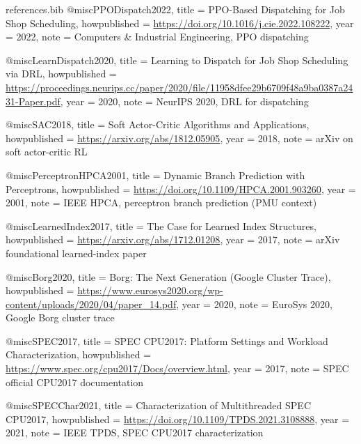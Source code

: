 \begin{filecontents*}{references.bib}
@misc{PPODispatch2022,
  title = {{PPO}-Based Dispatching for Job Shop Scheduling},
  howpublished = {\url{https://doi.org/10.1016/j.cie.2022.108222}},
  year = {2022},
  note = {Computers \& Industrial Engineering, PPO dispatching}
}

@misc{LearnDispatch2020,
  title = {Learning to Dispatch for Job Shop Scheduling via {DRL}},
  howpublished = {\url{https://proceedings.neurips.cc/paper/2020/file/11958dfee29b6709f48a9ba0387a2431-Paper.pdf}},
  year = {2020},
  note = {NeurIPS 2020, DRL for dispatching}
}

@misc{SAC2018,
  title = {Soft Actor-Critic Algorithms and Applications},
  howpublished = {\url{https://arxiv.org/abs/1812.05905}},
  year = {2018},
  note = {arXiv on soft actor-critic RL}
}

@misc{PerceptronHPCA2001,
  title = {Dynamic Branch Prediction with Perceptrons},
  howpublished = {\url{https://doi.org/10.1109/HPCA.2001.903260}},
  year = {2001},
  note = {IEEE HPCA, perceptron branch prediction (PMU context)}
}

@misc{LearnedIndex2017,
  title = {The Case for Learned Index Structures},
  howpublished = {\url{https://arxiv.org/abs/1712.01208}},
  year = {2017},
  note = {arXiv foundational learned-index paper}
}

@misc{Borg2020,
  title = {Borg: The Next Generation ({Google} Cluster Trace)},
  howpublished = {\url{https://www.eurosys2020.org/wp-content/uploads/2020/04/paper_14.pdf}},
  year = {2020},
  note = {EuroSys 2020, Google Borg cluster trace}
}

@misc{SPEC2017,
  title = {{SPEC CPU2017}: Platform Settings and Workload Characterization},
  howpublished = {\url{https://www.spec.org/cpu2017/Docs/overview.html}},
  year = {2017},
  note = {SPEC official CPU2017 documentation}
}

@misc{SPECChar2021,
  title = {Characterization of Multithreaded {SPEC CPU2017}},
  howpublished = {\url{https://doi.org/10.1109/TPDS.2021.3108888}},
  year = {2021},
  note = {IEEE TPDS, SPEC CPU2017 characterization}
}
\end{filecontents*}

\documentclass[conference]{IEEEtran}
\IEEEoverridecommandlockouts
\usepackage{mathptmx} %
\usepackage{cite}
\usepackage{amsmath,amssymb,amsfonts}
\usepackage{algorithmic}
\usepackage{graphicx}
\usepackage{textcomp}
\usepackage{xcolor}
\usepackage{booktabs}
\usepackage{multirow}
\usepackage{url}

